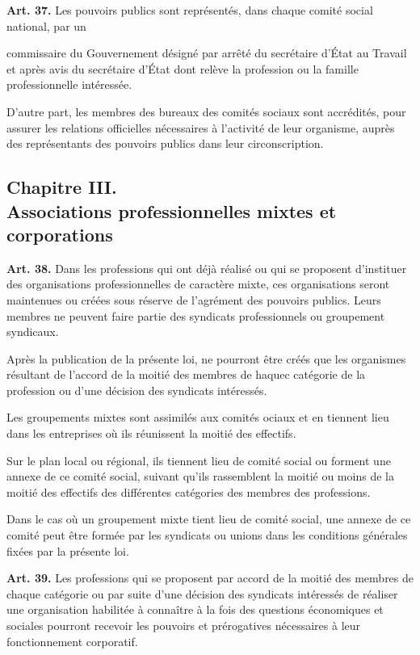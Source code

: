 \documentclass[french,twoside]{book} %
\newcommand{\labelchar}[1]{\textbf{\color{rubric} #1}}
\begin{document}
\noindent \labelchar{Art. 37.} Les pouvoirs publics sont représentés, dans chaque comité social national, par un\par
commissaire du Gouvernement désigné par arrêté du secrétaire d’État au Travail et après avis du secrétaire d’État dont relève la profession ou la famille professionnelle intéressée.\par
D’autre part, les membres des bureaux des comités sociaux sont accrédités, pour assurer les relations officielles nécessaires à l’activité de leur organisme, auprès des représentants des pouvoirs publics dans leur circonscription.
\subsection[Chapitre III. Associations professionnelles mixtes et corporations]{Chapitre III. \\
Associations professionnelles mixtes et corporations}
\noindent \labelchar{Art. 38.} Dans les professions qui ont déjà réalisé ou qui se proposent d’instituer des organisations professionnelles de caractère mixte, ces organisations seront maintenues ou créées sous réserve de l’agrément des pouvoirs publics. Leurs membres ne peuvent faire partie des syndicats professionnels ou groupement syndicaux.\par
Après la publication de la présente loi, ne pourront être créés que les organismes résultant de l’accord de la moitié des membres de haquec catégorie de la profession ou d’une décision des syndicats intéressés.\par
Les groupements mixtes sont assimilés aux comités ociaux et en tiennent lieu dans les entreprises où ils réunissent la moitié des effectifs.\par
Sur le plan local ou régional, ils tiennent lieu de comité social ou forment une annexe de ce comité social, suivant qu’ils rassemblent la moitié ou moins de la moitié des effectifs des différentes catégories des membres des professions.\par
Dans le cas où un groupement mixte tient lieu de comité social, une annexe de ce comité peut être formée par les syndicats ou unions dans les conditions générales fixées par la présente loi.\par
\bigbreak
\noindent \labelchar{Art. 39.} Les professions qui se proposent par accord de la moitié des membres de chaque catégorie ou par suite d’une décision des syndicats intéressés de réaliser une organisation habilitée à connaître à la fois des questions économiques et sociales pourront recevoir les pouvoirs et prérogatives nécessaires à leur fonctionnement corporatif.\par
\end{document}
